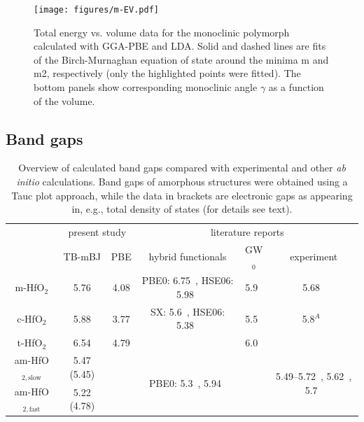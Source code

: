\documentclass[10pt,a4paper,twocolumn]{article}
\begin{document}
\begin{figure}
\begin{center}
	\texttt{[image: figures/m-EV.pdf]}
	\caption{Total energy vs. volume data for the monoclinic polymorph calculated with GGA-PBE and LDA. Solid and dashed lines are fits of the Birch-Murnaghan equation of state around the minima m and m2, respectively (only the highlighted points were fitted). The bottom panels show corresponding  monoclinic angle $\gamma$ as a function of the volume.}
   \label{EV}
\end{center}
\end{figure}

\subsection{Band gaps}

\begin{table}
\begin{center}

\caption{Overview of calculated band gaps compared with experimental and other \textit{ab initio} calculations. Band gaps of amorphous structures were obtained using a Tauc plot approach, while the data in brackets are electronic gaps as appearing in, e.g., total density of states (for details see text).}
\label{gaps}

\begin{tabular}{c|cc|ccc}
& \multicolumn{2}{c|}{present study} & \multicolumn{3}{c}{literature reports}\\
			& TB-mBJ  & PBE & hybrid functionals & GW$_0$ & experiment \\
\hline
m-HfO$_2$ &	5.76 & 4.08 & PBE0: 6.75~\cite{Komsa2010}, HSE06: 5.98~\cite{Komsa2010} & 5.9~\cite{Gruning2010} & 5.68~\cite{Balog1977} \\
c-HfO$_2$ &	5.88 & 3.77 & SX: 5.6~\cite{Clark2010}, HSE06: 5.38~\cite{Yang2014} & 5.5~\cite{Gruning2010} & 5.8$^A$~\cite{Lim2002}\\
t-HfO$_2$ &	6.54 & 4.79 &  & 6.0~\cite{Gruning2010} & \\
am-HfO$_{2,\mathrm{slow}}$ & 5.47 (5.45) & & \multirow{2}{*}{PBE0: 5.3~\cite{Broqvist2007}, 5.94~\cite{Chen2011}} &  & \multirow{2}{*}{5.49--5.72~\cite{Takeuchi2004}, 5.62~\cite{Nguyen2005}, 5.7~\cite{Perevalov2007}}\\
am-HfO$_{2,\mathrm{fast}}$ & 5.22 (4.78) & &  &  & \\

\end{tabular}
\end{center}
\end{table}
\end{document}

